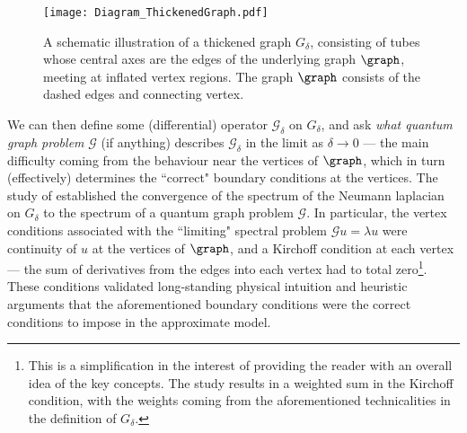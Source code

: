 \begin{figure}[b]
	\centering
	\texttt{[image: Diagram\_ThickenedGraph.pdf]}
	\caption{\label{fig:Diagram_ThickenedGraph} A schematic illustration of a thickened graph $G_{\delta}$, consisting of tubes whose central axes are the edges of the underlying graph $\graph$, meeting at inflated vertex regions. The graph $\graph$ consists of the dashed edges and connecting vertex.}
\end{figure}
We can then define some (differential) operator $\mathcal{G}_{\delta}$ on $G_{\delta}$, and ask \emph{what quantum graph problem} $\mathcal{G}$ (if anything) describes $\mathcal{G}_{\delta}$ in the limit as $\delta\rightarrow0$ --- the main difficulty coming from the behaviour near the vertices of $\graph$, which in turn (effectively) determines the ``correct" boundary conditions at the vertices.
The study of  established the convergence of the spectrum of the Neumann laplacian on $G_{\delta}$ to the spectrum of a quantum graph problem $\mathcal{G}$.
In particular, the vertex conditions associated with the ``limiting" spectral problem $\mathcal{G}u = \lambda u$ were continuity of $u$ at the vertices of $\graph$, and a Kirchoff condition at each vertex --- the sum of derivatives from the edges into each vertex had to total zero\footnote{This is a simplification in the interest of providing the reader with an overall idea of the key concepts. The study  results in a weighted sum in the Kirchoff condition, with the weights coming from the aforementioned technicalities in the definition of $G_{\delta}$.}.
These conditions validated long-standing physical intuition and heuristic arguments that the aforementioned boundary conditions were the correct conditions to impose in the approximate model.

